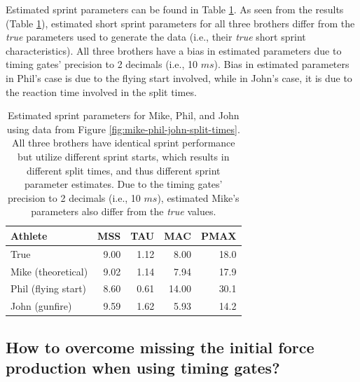 \documentclass[fleqn,10pt,lineno]{wlpeerj} %
\begin{document}
Estimated sprint parameters can be found in Table \ref{tab:mike-phil-john-est-params}. As seen from the results (Table \ref{tab:mike-phil-john-est-params}), estimated short sprint parameters for all three brothers differ from the \emph{true} parameters used to generate the data (i.e., their \emph{true} short sprint characteristics). All three brothers have a bias in estimated parameters due to timing gates' precision to 2 decimals (i.e., 10 \(ms\)). Bias in estimated parameters in Phil's case is due to the flying start involved, while in John's case, it is due to the reaction time involved in the split times.



\begin{table}

\caption{\label{tab:mike-phil-john-est-params}Estimated sprint parameters for Mike, Phil, and John using data from Figure \ref{fig:mike-phil-john-split-times}. All three brothers have identical sprint performance but utilize different sprint starts, which results in different split times, and thus different sprint parameter estimates. Due to the timing gates' precision to 2 decimals (i.e., 10 \(ms\)), estimated Mike's parameters also differ from the \emph{true} values.}
\centering
\begin{tabular}[t]{lrrrr}
\toprule
Athlete & MSS & TAU & MAC & PMAX\\
\midrule
True & 9.00 & 1.12 & 8.00 & 18.0\\
Mike (theoretical) & 9.02 & 1.14 & 7.94 & 17.9\\
Phil (flying start) & 8.60 & 0.61 & 14.00 & 30.1\\
John (gunfire) & 9.59 & 1.62 & 5.93 & 14.2\\
\bottomrule
\end{tabular}
\end{table}

\hypertarget{how-to-overcome-missing-the-initial-force-production-when-using-timing-gates}{%
\subsection{How to overcome missing the initial force production when using timing gates?}\label{how-to-overcome-missing-the-initial-force-production-when-using-timing-gates}}
\end{document}
